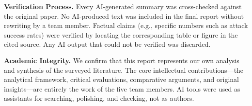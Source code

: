 \textbf{Verification Process.}
Every AI-generated summary was cross-checked against the original paper. No AI-produced text was included in the final report without rewriting by a team member. Factual claims (e.g., specific numbers such as attack success rates) were verified by locating the corresponding table or figure in the cited source. Any AI output that could not be verified was discarded.

\textbf{Academic Integrity.}
We confirm that this report represents our own analysis and synthesis of the surveyed literature. The core intellectual contributions---the analytical framework, critical evaluations, comparative arguments, and original insights---are entirely the work of the five team members. AI tools were used as assistants for searching, polishing, and checking, not as authors.
